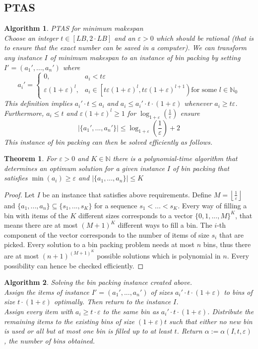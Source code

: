 \documentclass[a4paper, 12pt]{article}
\newtheorem{theorem}{Theorem}[section]
\newtheorem{alg}{Algorithm}[section]
\begin{document}
	\subsection{PTAS}
	\begin{alg}PTAS for minimum makespan\\
		Choose an integer $t \in [LB, 2\cdot LB]$ and an $\varepsilon > 0$ which should be rational (that is to ensure that the exact number can be saved in a computer). We can transform any instance $I$ of minimum makespan to an instance of bin packing by setting $I' = (a_1',...,a_n')$ where \[a_i' = \begin{cases}
			0, & a_i < t \varepsilon\\
			\varepsilon(1+\varepsilon)^l, & a_i \in \left[t \varepsilon(1+\varepsilon)^l, t \varepsilon(1+\varepsilon)^{l+1}\right) \text{for some }l \in \mathbb{N}_0
		\end{cases}\]  
		This definition implies $a_i' \cdot t \leq a_i$ and $a_i \leq a_i' \cdot t \cdot (1+\varepsilon)$ whenever $a_i \geq t \varepsilon$. Furthermore, $a_i \leq t$ and $\varepsilon(1+\varepsilon)^l \geq 1$ for $\log_{1+\varepsilon}\left(\frac{1}{\varepsilon}\right)$ ensure \[\left|\{a_1',...,a_n'\}\right| \leq \log_{1+\varepsilon}\left(\frac{1}{\varepsilon}\right) + 2\]
		This instance of bin packing can then be solved efficiently as follows.
	\end{alg}
	\begin{theorem}
		For $\varepsilon > 0$ and $K \in \mathbb{N}$ there is a polynomial-time algorithm that determines an optimum solution for a given instance $I$ of bin packing that satisfies $\min(a_i) \geq \varepsilon$ and $\left|\{a_1,...,a_n\}\right| \leq K$
	\end{theorem}
	\begin{proof}
		Let $I$ be an instance that satisfies above requirements. Define $M = \left\lfloor\frac{1}{\varepsilon}\right\rfloor$ and $\{a_1,...,a_n\} \subseteq \{s_1,...,s_K\}$ for a sequence $s_1 < ... < s_K$. Every way of filling a bin with items of the $K$ different sizes corresponds to a vector $\{0,1,...,M\}^K$, that means there are at most $(M+1)^K$ different ways to fill a bin. The $i$-th component of the vector corresponds to the number of items of size $s_i$ that are picked. Every solution to a bin packing problem needs at most $n$ bins, thus there are at most $(n+1)^{(M+1)^K}$ possible solutions which is polynomial in $n$. Every possibility can hence be checked efficiently.
	\end{proof}
	\begin{alg} Solving the bin packing instance created above.\\
		\normalfont Assign the items of instance $I' = (a_1',...,a_n')$ of sizes $a_i'\cdot t \cdot (1+\varepsilon)$ to bins of size $t\cdot (1+\varepsilon)$ optimally. Then return to the instance $I$.\\
		Assign every item with $a_i \geq t\cdot \varepsilon$ to the same bin as $a_i'\cdot t \cdot (1+\varepsilon)$. Distribute the remaining items to the existing bins of size $(1+\varepsilon)t$ such that either no new bin is used or all but at most one bin is filled up to at least $t$.
		Return $\alpha := \alpha(I,t,\varepsilon)$, the number of bins obtained.
	\end{alg}
\end{document}
